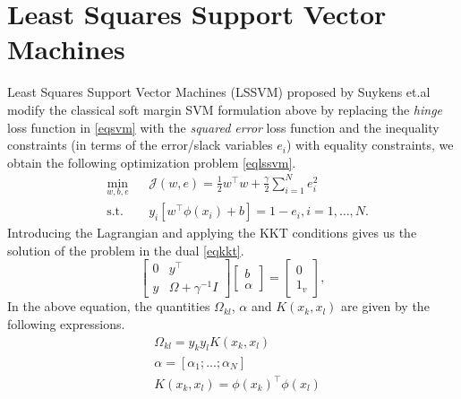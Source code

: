 \section{Least Squares Support Vector Machines}
Least Squares Support Vector Machines (LSSVM) proposed by Suykens et.al \cite{Suykens2002} \cite{Suykens1999} modify the classical soft margin SVM formulation above by replacing the \textit{hinge} loss function in \eqref{eqsvm} with the \textit{squared error} loss function and the inequality constraints (in terms of the error/slack variables $e_i$) with equality constraints, we obtain the following optimization problem \eqref{eqlssvm}.
\begin{equation}\label{eqlssvm}
\begin{aligned}
& \underset{w,b,e}{\text{min}}
& & \mathcal{J}(w,e) = \frac{1}{2}w^{\intercal}w + \frac{\gamma}{2}\sum\limits_{i=1}^N e_{i}^2 \\
& \text{s.t.}
& & y_{i}[ w^{\intercal}\phi(x_{i})+b ] = 1 - e_{i}, i=1,\ldots ,N.
\end{aligned}
\end{equation}
Introducing the Lagrangian and applying the KKT conditions gives us the solution of the problem in the dual \eqref{eqkkt}.
\begin{equation}\label{eqkkt}
\left[\begin{array}{c|c}
   0  & y^\intercal   \\ \hline
   y & \Omega + \gamma^{-1} \mathit{I} 
\end{array}\right] 
\left[\begin{array}{c}
   b    \\ \hline
   \alpha  
\end{array}\right] = \left[\begin{array}{c}
   0    \\ \hline
   1_v  
\end{array}\right],
\end{equation}
In the above equation, the quantities $\Omega_{kl}$, $\alpha$ and $K(x_k,x_l)$ are given by the following expressions.
\begin{equation*}
\begin{aligned}
& \Omega_{kl} = y_{k}y_{l}K(x_{k}, x_{l}) \\
& \alpha = \left[\alpha_1 ; ... ; \alpha_N \right] \\
& K(x_k,x_l) = \phi(x_k)^\intercal\phi(x_l) \\
\end{aligned}
\end{equation*}

